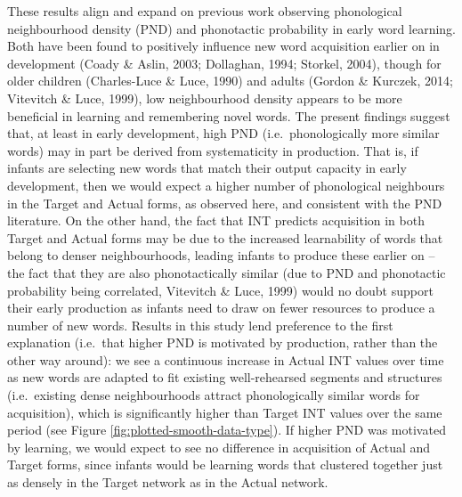 \documentclass[
  man]{apa6}
\begin{document}
These results align and expand on previous work observing phonological neighbourhood density (PND) and phonotactic probability in early word learning. Both have been found to positively influence new word acquisition earlier on in development (Coady \& Aslin, 2003; Dollaghan, 1994; Storkel, 2004), though for older children (Charles-Luce \& Luce, 1990) and adults (Gordon \& Kurczek, 2014; Vitevitch \& Luce, 1999), low neighbourhood density appears to be more beneficial in learning and remembering novel words. The present findings suggest that, at least in early development, high PND (i.e.~phonologically more similar words) may in part be derived from systematicity in production. That is, if infants are selecting new words that match their output capacity in early development, then we would expect a higher number of phonological neighbours in the Target and Actual forms, as observed here, and consistent with the PND literature. On the other hand, the fact that INT predicts acquisition in both Target and Actual forms may be due to the increased learnability of words that belong to denser neighbourhoods, leading infants to produce these earlier on -- the fact that they are also phonotactically similar (due to PND and phonotactic probability being correlated, Vitevitch \& Luce, 1999) would no doubt support their early production as infants need to draw on fewer resources to produce a number of new words. Results in this study lend preference to the first explanation (i.e.~that higher PND is motivated by production, rather than the other way around): we see a continuous increase in Actual INT values over time as new words are adapted to fit existing well-rehearsed segments and structures (i.e.~existing dense neighbourhoods attract phonologically similar words for acquisition), which is significantly higher than Target INT values over the same period (see Figure \ref{fig:plotted-smooth-data-type}). If higher PND was motivated by learning, we would expect to see no difference in acquisition of Actual and Target forms, since infants would be learning words that clustered together just as densely in the Target network as in the Actual network.
\end{document}
